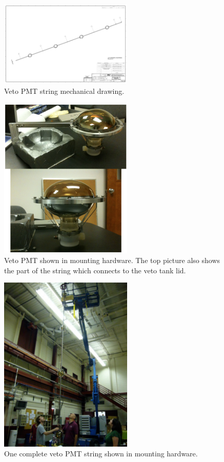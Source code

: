 \documentclass{JINST}
\begin{document}
\begin{figure}[ht]
\begin{center}
\includegraphics[width=2.5in,angle=0]{graphics/vetopmtstring.pdf}
\caption{Veto PMT string mechanical drawing.
\label{fig:vetopmtstring}}
\end{center}
\end{figure}

\begin{figure}[ht]
\begin{center}
\includegraphics[width=2.5in]{graphics/vetopmtmountpic.pdf}
\caption{Veto PMT shown in mounting hardware.  The top picture also shows the part of the string which connects to the veto tank lid.
\label{fig:vetopmtmountpic}}
\end{center}
\end{figure}

\begin{figure}[ht]
\begin{center}
\includegraphics[width=2.5in]{graphics/vetopmtstringpic.pdf}
\caption{One complete veto PMT string shown in mounting hardware.
\label{fig:vetopmtstringpic}}
\end{center}
\end{figure}
\end{document}
